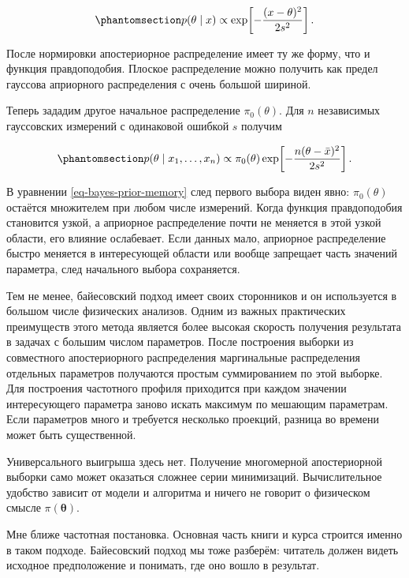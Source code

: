 \documentclass[
  russian,
  11pt,
  a4paper,
  open=any]{scrbook}
\begin{document}
\begin{equation}\protect\phantomsection\label{eq-bayes-flat-prior}{
p(\theta\mid x)
\propto
\exp\!\left[-\frac{(x-\theta)^2}{2s^2}\right].
}\end{equation}

После нормировки апостериорное распределение имеет ту же форму, что и
функция правдоподобия. Плоское распределение можно получить как предел
гауссова априорного распределения с очень большой шириной.

Теперь зададим другое начальное распределение \(\pi_0(\theta)\). Для
\(n\) независимых гауссовских измерений с одинаковой ошибкой \(s\)
получим

\begin{equation}\protect\phantomsection\label{eq-bayes-prior-memory}{
p(\theta\mid x_1,\ldots,x_n)
\propto
\pi_0(\theta)
\exp\!\left[-\frac{n(\theta-\bar x)^2}{2s^2}\right].
}\end{equation}

В уравнении \ref{eq-bayes-prior-memory} след первого выбора виден явно:
\(\pi_0(\theta)\) остаётся множителем при любом числе измерений. Когда
функция правдоподобия становится узкой, а априорное распределение почти
не меняется в этой узкой области, его влияние ослабевает. Если данных
мало, априорное распределение быстро меняется в интересующей области или
вообще запрещает часть значений параметра, след начального выбора
сохраняется.

Тем не менее, байесовский подход имеет своих сторонников и он
используется в большом числе физических анализов. Одним из важных
практических преимуществ этого метода является более высокая скорость
получения результата в задачах с большим числом параметров. После
построения выборки из совместного апостериорного распределения
маргинальные распределения отдельных параметров получаются простым
суммированием по этой выборке. Для построения частотного профиля
приходится при каждом значении интересующего параметра заново искать
максимум по мешающим параметрам. Если параметров много и требуется
несколько проекций, разница во времени может быть существенной.

Универсального выигрыша здесь нет. Получение многомерной апостериорной
выборки само может оказаться сложнее серии минимизаций. Вычислительное
удобство зависит от модели и алгоритма и ничего не говорит о физическом
смысле \(\pi(\boldsymbol{\theta})\).

Мне ближе частотная постановка. Основная часть книги и курса строится
именно в таком подходе. Байесовский подход мы тоже разберём: читатель
должен видеть исходное предположение и понимать, где оно вошло в
результат.
\end{document}
